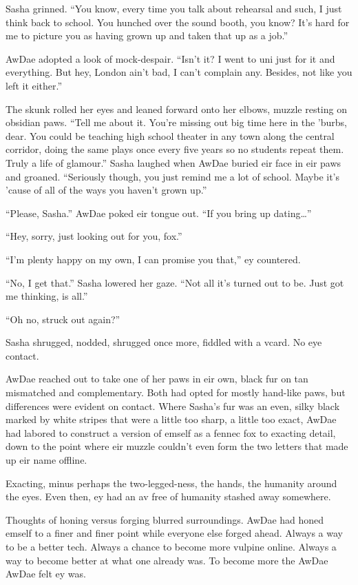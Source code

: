 Sasha grinned. ``You know, every time you talk about rehearsal and such, I just think back to school. You hunched over the sound booth, you know? It's hard for me to picture you as having grown up and taken that up as a job.''

AwDae adopted a look of mock-despair. ``Isn't it? I went to uni just for it and everything. But hey, London ain't bad, I can't complain any. Besides, not like you left it either.''

The skunk rolled her eyes and leaned forward onto her elbows, muzzle resting on obsidian paws. ``Tell me about it. You're missing out big time here in the 'burbs, dear. You could be teaching high school theater in any town along the central corridor, doing the same plays once every five years so no students repeat them. Truly a life of glamour.'' Sasha laughed when AwDae buried eir face in eir paws and groaned. ``Seriously though, you just remind me a lot of school. Maybe it's 'cause of all of the ways you haven't grown up.''

``Please, Sasha.'' AwDae poked eir tongue out. ``If you bring up dating\ldots{}''

``Hey, sorry, just looking out for you, fox.''

``I'm plenty happy on my own, I can promise you that,'' ey countered.

``No, I get that.'' Sasha lowered her gaze. ``Not all it's turned out to be. Just got me thinking, is all.''

``Oh no, struck out again?''

Sasha shrugged, nodded, shrugged once more, fiddled with a vcard. No eye contact.

AwDae reached out to take one of her paws in eir own, black fur on tan mismatched and complementary. Both had opted for mostly hand-like paws, but differences were evident on contact. Where Sasha's fur was an even, silky black marked by white stripes that were a little too sharp, a little too exact, AwDae had labored to construct a version of emself as a fennec fox to exacting detail, down to the point where eir muzzle couldn't even form the two letters that made up eir name offline.

Exacting, minus perhaps the two-legged-ness, the hands, the humanity around the eyes. Even then, ey had an av free of humanity stashed away somewhere.

Thoughts of honing versus forging blurred surroundings. AwDae had honed emself to a finer and finer point while everyone else forged ahead. Always a way to be a better tech. Always a chance to become more vulpine online. Always a way to become better at what one already was. To become more the AwDae AwDae felt ey was.

